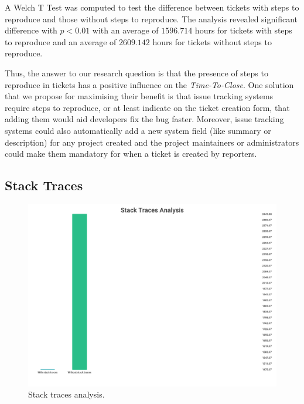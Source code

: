 \documentclass{mpaper}
\begin{document}
A Welch T Test was computed to test the difference between tickets with steps to reproduce 
and those without steps to reproduce. The analysis revealed significant difference with 
$p < 0.01$ with an average of $1596.714$ hours for tickets with steps to reproduce and an average of 
$2609.142$ hours for tickets without steps to reproduce.

Thus, the answer to our research question is that the presence of steps to reproduce in tickets 
has a positive influence on the \emph{Time-To-Close}. One solution that we propose for maximising their benefit 
is that issue tracking systems require steps to reproduce, or at least indicate on the ticket creation form, 
that adding them would aid developers fix the bug faster. Moreover, 
issue tracking systems could also automatically add a new system field (like summary or description) 
for any project created and the project maintainers or administrators could make them mandatory for 
when a ticket is created by reporters.

\vskip12pt

\subsection{Stack Traces}

\begin{figure}[ht]
  \begin{center}
    \includegraphics[scale=0.18]{images/stack_traces.png}
  \end{center}
  \caption{\label{stack_traces}Stack traces analysis.}
\end{figure}
\end{document}
